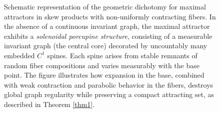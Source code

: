 \documentclass[11pt,reqno]{amsart}
\theoremstyle{plain}
\newtheorem*{theorem A}{Theorem A}
\newtheorem*{theorem B}{Theorem B}
\newtheorem*{theorem C}{Theorem C}
\newtheorem*{theorem 1}{Theorem 1}
\newtheorem*{theorem 2}{Theorem 2}
\newtheorem*{theorem 3}{Theorem 3}
\numberwithin{equation}{section}
\begin{document}
\begin{figure}[ht]
\centering
{}
\caption{
Schematic representation of the geometric dichotomy for maximal attractors in skew
products with non-uniformly contracting fibers.
In the absence of a continuous invariant graph, the maximal attractor exhibits a
\emph{solenoidal porcupine structure}, consisting of a measurable invariant graph
(the central core) decorated by uncountably many embedded $C^{1}$ spines.
Each spine arises from stable remnants of random fiber compositions and varies
measurably with the base point.
The figure illustrates how expansion in the base, combined with weak contraction
and parabolic behavior in the fibers, destroys global graph regularity while preserving
a compact attracting set, as described in Theorem \ref{thm1}.
}
\label{fig:dichotomy}
\end{figure}
\end{document}

